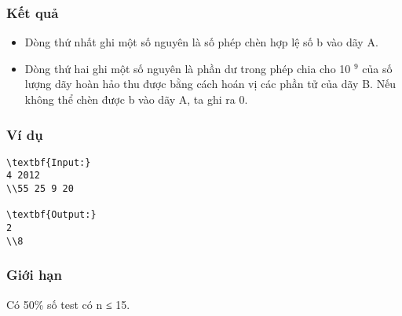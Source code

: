 \subsubsection{   Kết quả  }
\begin{itemize}
	\item     Dòng thứ nhất ghi một số nguyên là số phép chèn hợp lệ số b vào dãy A.   
	\item     Dòng thứ hai ghi một số nguyên là phần dư trong phép chia cho 10    $^     9    $    của số lượng dãy hoàn hảo thu được bằng cách hoán vị các phần tử của dãy B. Nếu không thể chèn được b vào dãy A, ta ghi ra 0.   
\end{itemize}

\subsubsection{   Ví dụ  }
\begin{verbatim}
\textbf{Input:}
4 2012
\\55 25 9 20

\textbf{Output:}
2
\\8\end{verbatim}

\subsubsection{   Giới hạn  }

   Có 50\% số test có n ≤ 15.  